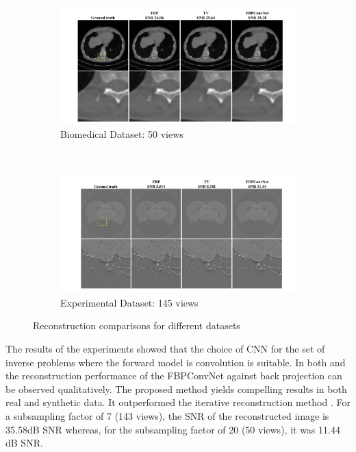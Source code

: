 \documentclass[journal, onecolumn, 11pt]{IEEEtran}
\begin{document}

\begin{figure}[h]
\centering
\begin{subfigure}[b]{0.75\textwidth}
\centering
\includegraphics[width=\textwidth]{images/results1.png}
\caption{Biomedical Dataset: 50 views}\label{subfig:a}
\end{subfigure}
\\
\begin{subfigure}[b]{0.75\linewidth}
\centering
\includegraphics[width=\textwidth]{images/results2.png}
\caption{Experimental Dataset: 145 views}\label{subfig:b}
\end{subfigure}
\caption{Reconstruction comparisons for different datasets}
\label{fig:recs}
\end{figure}

The results of the experiments showed that the choice of CNN for the set of inverse problems where the forward model is convolution is suitable. In both  and  the reconstruction performance of the FBPConvNet against back projection can be observed qualitatively. The proposed method yields compelling results in both real and synthetic data. It outperformed the iterative reconstruction method \cite{TV}. For a subsampling factor of 7 (143 views), the SNR of the reconstructed image is 35.58dB SNR whereas, for the subsampling factor of 20 (50 views), it was 11.44 dB SNR. 
\end{document}
